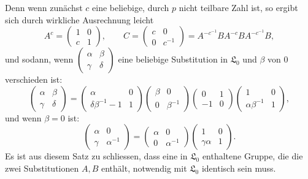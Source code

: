 \documentclass[11pt]{article}
\newcommand{\Lzero}{\mathfrak L_0}
\begin{document}
Denn wenn zunächst $c$ eine beliebige, durch $p$ nicht teilbare Zahl ist, so ergibt sich durch wirkliche Ausrechnung leicht
\begin{equation}
 A^c=\begin{pmatrix}1&0\\ c&1\end{pmatrix},
 \qquad
 C=\begin{pmatrix}c&0\\0&c^{-1}\end{pmatrix}
 =A^{-c^{-1}}BA^{-c}BA^{-c^{-1}}B,
\tag{11}
\end{equation}
und sodann, wenn $\begin{pmatrix}\alpha&\beta\\\gamma&\delta\end{pmatrix}$ eine beliebige Substitution in $\Lzero$ und $\beta$ von $0$ verschieden ist:
\begin{equation}
 \begin{pmatrix}\alpha&\beta\\\gamma&\delta\end{pmatrix}
 =\begin{pmatrix}\alpha&0\\ \delta\beta^{-1}-1&1\end{pmatrix}
 \begin{pmatrix}\beta&0\\0&\beta^{-1}\end{pmatrix}
 \begin{pmatrix}0&1\\-1&0\end{pmatrix}
 \begin{pmatrix}1&0\\ \alpha\beta^{-1}&1\end{pmatrix},
\tag{12}
\end{equation}
und wenn $\beta=0$ ist:
\begin{equation}
 \begin{pmatrix}\alpha&0\\\gamma&\alpha^{-1}\end{pmatrix}
 =\begin{pmatrix}\alpha&0\\0&\alpha^{-1}\end{pmatrix}
 \begin{pmatrix}1&0\\\gamma\alpha&1\end{pmatrix}.
\tag{13}
\end{equation}
Es ist aus diesem Satz zu schliessen, dass eine in $\Lzero$ enthaltene Gruppe, die die zwei Substitutionen $A,B$ enthält, notwendig mit $\Lzero$ identisch sein muss.
\end{document}

